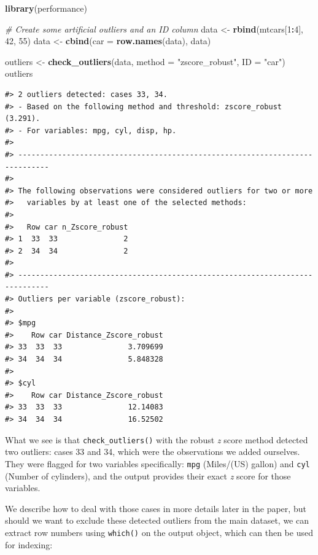 \documentclass[sn-basic, lineno,pdflatex]{sn-jnl}
\newenvironment{Shaded}{\begin{snugshade}}{\end{snugshade}}
\newcommand{\AttributeTok}[1]{\textcolor[rgb]{0.13,0.29,0.53}{#1}}
\newcommand{\CommentTok}[1]{\textcolor[rgb]{0.56,0.35,0.01}{\textit{#1}}}
\newcommand{\DecValTok}[1]{\textcolor[rgb]{0.00,0.00,0.81}{#1}}
\newcommand{\FunctionTok}[1]{\textcolor[rgb]{0.13,0.29,0.53}{\textbf{#1}}}
\newcommand{\NormalTok}[1]{#1}
\newcommand{\OtherTok}[1]{\textcolor[rgb]{0.56,0.35,0.01}{#1}}
\newcommand{\SpecialCharTok}[1]{\textcolor[rgb]{0.81,0.36,0.00}{\textbf{#1}}}
\newcommand{\StringTok}[1]{\textcolor[rgb]{0.31,0.60,0.02}{#1}}
\begin{document}
\begin{Shaded}
\begin{Highlighting}[]
\FunctionTok{library}\NormalTok{(performance)}

\CommentTok{\# Create some artificial outliers and an ID column}
\NormalTok{data }\OtherTok{\textless{}{-}} \FunctionTok{rbind}\NormalTok{(mtcars[}\DecValTok{1}\SpecialCharTok{:}\DecValTok{4}\NormalTok{], }\DecValTok{42}\NormalTok{, }\DecValTok{55}\NormalTok{)}
\NormalTok{data }\OtherTok{\textless{}{-}} \FunctionTok{cbind}\NormalTok{(}\AttributeTok{car =} \FunctionTok{row.names}\NormalTok{(data), data)}

\NormalTok{outliers }\OtherTok{\textless{}{-}} \FunctionTok{check\_outliers}\NormalTok{(data, }\AttributeTok{method =} \StringTok{"zscore\_robust"}\NormalTok{, }\AttributeTok{ID =} \StringTok{"car"}\NormalTok{)}
\NormalTok{outliers}
\end{Highlighting}
\end{Shaded}

\begin{verbatim}
#> 2 outliers detected: cases 33, 34.
#> - Based on the following method and threshold: zscore_robust (3.291).
#> - For variables: mpg, cyl, disp, hp.
#> 
#> -----------------------------------------------------------------------------
#>  
#> The following observations were considered outliers for two or more
#>   variables by at least one of the selected methods:
#> 
#>   Row car n_Zscore_robust
#> 1  33  33               2
#> 2  34  34               2
#> 
#> -----------------------------------------------------------------------------
#> Outliers per variable (zscore_robust): 
#> 
#> $mpg
#>    Row car Distance_Zscore_robust
#> 33  33  33               3.709699
#> 34  34  34               5.848328
#> 
#> $cyl
#>    Row car Distance_Zscore_robust
#> 33  33  33               12.14083
#> 34  34  34               16.52502
\end{verbatim}

What we see is that \texttt{check\_outliers()} with the robust \emph{z}
score method detected two outliers: cases 33 and 34, which were the
observations we added ourselves. They were flagged for two variables
specifically: \texttt{mpg} (Miles/(US) gallon) and \texttt{cyl} (Number
of cylinders), and the output provides their exact \emph{z} score for
those variables.

We describe how to deal with those cases in more details later in the
paper, but should we want to exclude these detected outliers from the
main dataset, we can extract row numbers using \texttt{which()} on the
output object, which can then be used for indexing:
\end{document}

